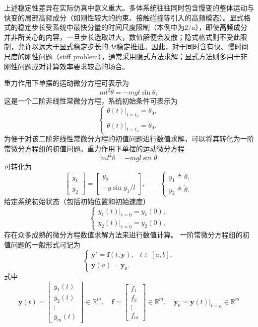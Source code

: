 \begin{note}
上述稳定性差异在实际仿真中意义重大。多体系统往往同时包含慢变的整体运动与快变的局部高频成分（如刚性较大的约束、接触碰撞等引入的高频模态）。显式格式的稳定步长受系统中最快分量的时间尺度限制（本例中为$2/a$），即使高频成分并非所关心的内容，一旦步长选取过大，数值解便会发散；隐式格式则不受此限制，允许以远大于显式稳定步长的$\Delta t$稳定推进。因此，对于同时含有快、慢时间尺度的刚性问题（stiff problem），通常采用隐式方法求解；显式方法则多用于非刚性问题或对计算效率要求较高的场合。
\end{note}
重力作用下单摆的运动微分方程可表示为
\[
ml^2\ddot{\theta} = -mgl\sin\theta,
\]
这是一个二阶非线性常微分方程，系统初始条件可表示为
\[
\begin{cases}
        \theta(t)\big|_{t=t_0} = \theta_0,\\[4pt]
        \dot{\theta}(t)\big|_{t=t_0} = \dot{\theta}_0.
    \end{cases}
\]
为便于对该二阶非线性常微分方程的初值问题进行数值求解，可以将其转化为一阶常微分方程组的初值问题。重力作用下单摆的运动微分方程
\[
ml^2\ddot{\theta} = -mgl\sin\theta
\]
可转化为
\[
\begin{bmatrix}
        \dot{y}_1\\[3pt] \dot{y}_2
    \end{bmatrix}
    =
    \begin{bmatrix}
        y_2\\[3pt] -g\sin y_1/l
    \end{bmatrix},
    \qquad
    \begin{cases}
        y_1 \triangleq \theta,\\[3pt]
        y_2 \triangleq \dot{\theta}.
    \end{cases}
\]
给定系统初始状态（包括初始位置和初始速度）
\[
\begin{cases}
        y_1(t)\big|_{t=0} = y_1(0),\\[4pt]
        y_2(t)\big|_{t=0} = y_2(0),
    \end{cases}
\]
存在众多成熟的微分方程数值求解方法来进行数值计算。
一阶常微分方程组的初值问题的一般形式可记为
\[
\begin{cases}
        \boldsymbol{y}' = \boldsymbol{f}(t,\boldsymbol{y}), & t \in [a,b],\\[4pt]
        \boldsymbol{y}(a) = \boldsymbol{y}_0.
    \end{cases}
\]
式中
\[
\boldsymbol{y}(t) = \begin{bmatrix} y_1(t)\\ y_2(t)\\ \vdots\\ y_m(t) \end{bmatrix} \in \mathbb{R}^m,\quad
    \boldsymbol{f} = \begin{bmatrix} f_1\\ f_2\\ \vdots\\ f_m \end{bmatrix} \in \mathbb{R}^m,\quad
    \boldsymbol{y}_0 = \boldsymbol{y}(t)\big|_{t=a} \in \mathbb{R}^m
\]
